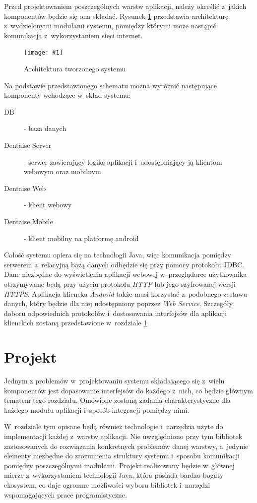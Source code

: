 \documentclass[11pt]{aghdpl}
\newcommand{\fullWidthPicture}[2]{
\begin{figure}[h!]
	\centering
		\texttt{[image: \#1]}
	\caption{#2}
	\label{fig:#1}
\end{figure}
}
\begin{document}
Przed projektowaniem poszczególnych warstw aplikacji, należy określić z~jakich komponentów będzie się ona składać. Rysunek \ref{fig:architektura} przedstawia architekturę z~wydzielonymi modułami systemu, pomiędzy którymi może nastąpić komunikacja z~wykorzystaniem sieci internet.

\fullWidthPicture{architektura}{Architektura tworzonego systemu}

Na podstawie przedstawionego schematu można wyróżnić następujące komponenty wchodzące w~skład systemu:
\begin{description}
\item[DB] - baza danych
\item[Dentaise Server] - serwer zawierający logikę aplikacji i~udostępniający ją klientom webowym oraz mobilnym
\item[Dentaise Web] - klient webowy
\item[Dentaise Mobile] - klient mobilny na platformę android
\end{description}

Całość systemu opiera się na technologii Java, więc komunikacja pomiędzy serwerem a~relacyjną bazą danych odbędzie się przy pomocy protokołu JDBC. Dane niezbędne do wyświetlenia aplikacji webowej w~przeglądarce użytkownika otrzymywane będą przy użyciu protokołu \emph{HTTP} lub jego szyfrowanej wersji \emph{HTTPS}. Aplikacja kliencka \emph{Android} także musi korzystać z~podobnego zestawu danych, który będzie dla niej udostępniony poprzez \emph{Web Service}. Szczegóły doboru odpowiednich protokołów i~dostosowania interfejsów dla aplikacji klienckich zostaną przedstawione w~rozdziale \ref{cha:dobor_technologii_i_narzedzi}. 


\chapter{Projekt}
\label{cha:dobor_technologii_i_narzedzi}

Jednym z problemów w~projektowaniu systemu składającego się z~wielu komponentów jest dopasowanie interfejsów do każdego z~nich, co będzie głównym tematem tego rozdziału. Omówione zostaną zadania charakterystyczne dla każdego modułu aplikacji i~sposób integracji pomiędzy nimi.

W~rozdziale tym opisane będą również technologie i~narzędzia użyte do implementacji każdej z~warstw aplikacji. Nie uwzględniono przy tym bibliotek zastosowanych do rozwiązania konkretnych problemów danej warstwy, a~jedynie elementy niezbędne do zrozumienia struktury systemu i~sposobu komunikacji pomiędzy poszczególnymi modułami. Projekt realizowany będzie w~głównej mierze z~wykorzystaniem technologii Java, która posiada bardzo bogaty ekosystem, co daje ogromne możliwości wyboru bibliotek i~narzędzi wspomagających prace programistyczne.
\end{document}
